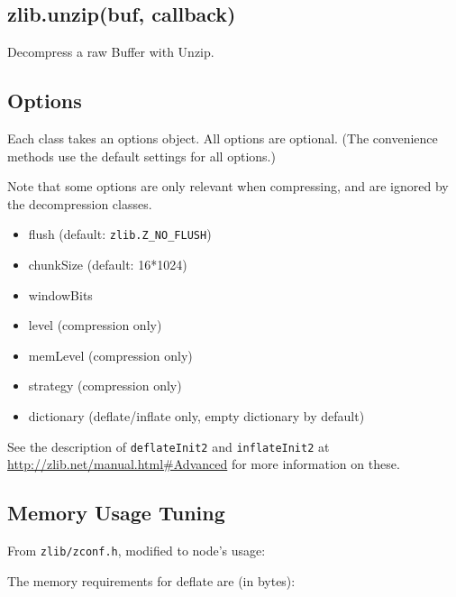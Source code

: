 \subsection{zlib.unzip(buf, callback)}

Decompress a raw Buffer with Unzip.

\subsection{Options}

Each class takes an options object. All options are optional. (The
convenience methods use the default settings for all options.)

Note that some options are only relevant when compressing, and are
ignored by the decompression classes.

\begin{itemize}
\item
  flush (default: \texttt{zlib.Z\_NO\_FLUSH})
\item
  chunkSize (default: 16*1024)
\item
  windowBits
\item
  level (compression only)
\item
  memLevel (compression only)
\item
  strategy (compression only)
\item
  dictionary (deflate/inflate only, empty dictionary by default)
\end{itemize}

See the description of \texttt{deflateInit2} and \texttt{inflateInit2}
at \url{http://zlib.net/manual.html#Advanced} for more information on
these.

\subsection{Memory Usage Tuning}

From \texttt{zlib/zconf.h}, modified to node's usage:

The memory requirements for deflate are (in bytes):

\begin{Shaded}
\begin{Highlighting}[]
\NormalTok{(} \NormalTok{)) +  (} \NormalTok{))}
\end{Highlighting}
\end{Shaded}

